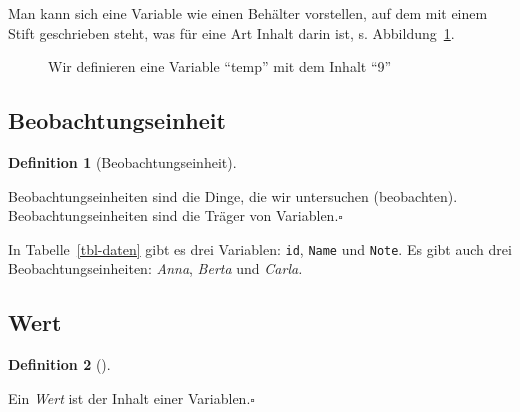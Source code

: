 \documentclass[
  a4paper,
  DIV=11]{scrreprt}
\theoremstyle{definition}
\theoremstyle{definition}
\theoremstyle{definition}
\newtheorem{definition}{Definition}[chapter]
\theoremstyle{remark}
\begin{document}
Man kann sich eine Variable wie einen Behälter vorstellen, auf dem mit
einem Stift geschrieben steht, was für eine Art Inhalt darin ist, s.
Abbildung~\ref{fig-var-zuweisen}.

\begin{figure}


\caption{\label{fig-var-zuweisen}Wir definieren eine Variable ``temp''
mit dem Inhalt ``9''}

\end{figure}%

\subsection{Beobachtungseinheit}\label{beobachtungseinheit}

\begin{definition}[Beobachtungseinheit]\protect\hypertarget{def-beobeinheit}{}\label{def-beobeinheit}

Beobachtungseinheiten sind die Dinge, die wir untersuchen (beobachten).
Beobachtungseinheiten sind die Träger von Variablen.\(\square\)

\end{definition}

In Tabelle~\ref{tbl-daten} gibt es drei Variablen: \texttt{id},
\texttt{Name} und \texttt{Note}. Es gibt auch drei
Beobachtungseinheiten: \emph{Anna}, \emph{Berta} und \emph{Carla.}

\subsection{Wert}\label{wert}

\begin{definition}[]\protect\hypertarget{def-wert}{}\label{def-wert}

Ein \emph{Wert} ist der Inhalt einer Variablen.\(\square\)

\end{definition}
\end{document}
